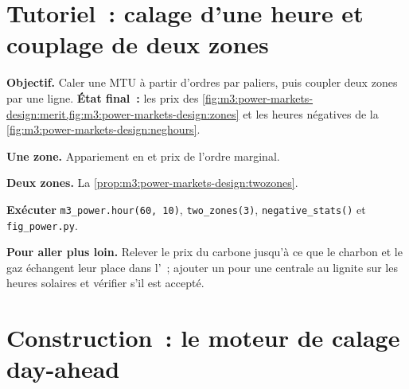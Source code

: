 \section{Tutoriel~: calage d'une heure et couplage de deux zones}\label{tut:m3:power-markets-design:clear}

\begin{tutorial}
\textbf{Objectif.} Caler une MTU à partir d'ordres par paliers, puis coupler deux zones par une ligne.
\textbf{État final~:} les prix des \cref{fig:m3:power-markets-design:merit,fig:m3:power-markets-design:zones}
et les heures négatives de la \cref{fig:m3:power-markets-design:neghours}.
\begin{tutsteps}
\item \textbf{Une zone.} Appariement en  et prix de l'ordre marginal.
\label{lst:m3:power-markets-design:clear}
\item \textbf{Deux zones.} La \cref{prop:m3:power-markets-design:twozones}.
\label{lst:m3:power-markets-design:couple}
\item \textbf{Exécuter} \texttt{m3\_power.hour(60, 10)}, \texttt{two\_zones(3)},
\texttt{negative\_stats()} et \texttt{fig\_power.py}.
\end{tutsteps}
\textbf{Pour aller plus loin.} Relever le prix du carbone jusqu'à ce que le charbon et le gaz échangent
leur place dans l'~; ajouter un  pour une centrale au lignite sur les
heures solaires et vérifier s'il est accepté.
\end{tutorial}

\section{Construction~: le moteur de calage day-ahead}\label{bld:m3:power-markets-design:dayahead}

